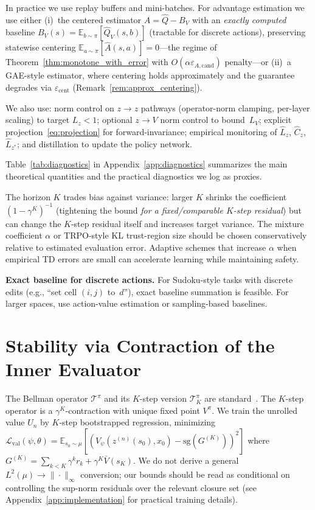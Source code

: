 \documentclass{article}
\theoremstyle{plain}
\theoremstyle{definition}
\theoremstyle{remark}
\newcommand{\shortonly}[1]{#1}
\newcommand{\longonly}[1]{}
\newcommand{\shortonly}[1]{}
\newcommand{\longonly}[1]{#1}
\newcommand{\E}{\mathbb{E}}
\begin{document}
{In practice we use replay buffers and mini-batches.
For advantage estimation we use either
(i)~the centered estimator\longonly{~\eqref{eq:Ahat_def}} $\widehat A = \widehat Q - B_V$ with an \emph{exactly computed} baseline $B_V(s)=\E_{b\sim\pi}[\widehat Q_V(s,b)]$ (tractable for discrete actions), preserving statewise centering $\E_{a\sim\pi}[\widehat A(s,a)]=0$---the regime of Theorem~\ref{thm:monotone_with_error} with $O(\alpha\varepsilon_{A,\mathrm{cand}})$ penalty---or
(ii)~a GAE-style estimator, where centering holds approximately and the guarantee degrades via $\varepsilon_{\mathrm{cent}}$ (Remark~\ref{rem:approx_centering}).

We also use:
norm control on $z{\to}z$ pathways (operator-norm clamping, per-layer scaling) to target $L_z<1$;
optional $z{\to}V$ norm control to bound~$L_V$;
explicit projection~\eqref{eq:projection} for forward-invariance;
empirical monitoring of $\hat L_z$, $\hat C_z$, $\widehat{L}_{z^*}$;
and distillation to update the policy network.

Table~\ref{tab:diagnostics} in Appendix~\ref{app:diagnostics} summarizes the main theoretical quantities and the practical diagnostics we log as proxies.

The horizon $K$ trades bias against variance: larger $K$ shrinks the coefficient $(1-\gamma^K)^{-1}$ (tightening the bound \emph{for a fixed/comparable $K$-step residual}) but can change the $K$-step residual itself and increases target variance.
The mixture coefficient $\alpha$ or TRPO-style KL trust-region size should be chosen conservatively relative to estimated evaluation error.
Adaptive schemes that increase $\alpha$ when empirical TD errors are small can accelerate learning while maintaining safety.

\textbf{Exact baseline for discrete actions.}
For Sudoku-style tasks with discrete edits (e.g., ``set cell $(i,j)$ to~$d$''), exact baseline summation is feasible.
For larger spaces, use action-value estimation or sampling-based baselines.}

\section{Stability via Contraction of the Inner Evaluator}
\label{sec:contraction}

\shortonly{
The Bellman operator $\mathcal{T}^\pi$ and its $K$-step version $\mathcal{T}^\pi_K$ are standard~\citep{SuttonBarto2018,Puterman1994}.
The $K$-step operator is a $\gamma^K$-contraction with unique fixed point $V^\pi$.
We train the unrolled value $U_n$ by $K$-step bootstrapped regression, minimizing $\mathcal{L}_{\mathrm{val}}(\psi,\theta)=\E_{s_0\sim\mu}[(V_\psi(z^{(n)}(s_0),x_0)-\mathrm{sg}(G^{(K)}))^2]$ where $G^{(K)}=\sum_{k<K}\gamma^k r_k + \gamma^K \bar V(s_K)$.
We do not derive a general $L^2(\mu)\to\|\cdot\|_\infty$ conversion; our bounds should be read as conditional on controlling the sup-norm residuals over the relevant closure set (see Appendix~\ref{app:implementation} for practical training details).}
\end{document}
